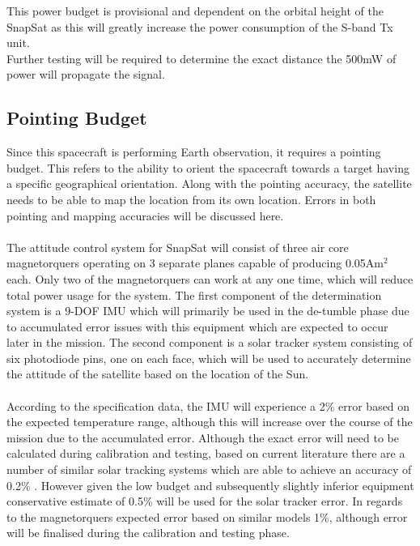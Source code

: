     \noindent
    This power budget is provisional and dependent on the orbital height of the SnapSat as this will greatly increase the power consumption of the S-band Tx unit. \\
    Further testing will be required to determine the exact distance the 500mW of power will propagate the signal.

\subsection{Pointing Budget}

Since this spacecraft is performing Earth observation, it requires a pointing budget. This refers to the ability to orient the spacecraft towards a target having a specific geographical orientation. Along with the pointing accuracy, the satellite needs to be able to map the location from its own location. Errors in both pointing and mapping accuracies will be discussed here. \\
\\\noindent
The attitude control system for SnapSat will consist of three air core magnetorquers operating on 3 separate planes capable of producing 0.05Am$^2$ each.  Only two of the magnetorquers can work at any one time, which will reduce total power usage for the system.  The first component of the determination system is a 9-DOF IMU which will primarily be used in the de-tumble phase due to accumulated error issues with this equipment which are expected to occur later in the mission.  The second component is a solar tracker system consisting of six photodiode pins, one on each face, which will be used to accurately determine the attitude of the satellite based on the location of the Sun. \\
\\\noindent
According to the specification data, the IMU will experience a 2\% error based on the expected temperature range, although this will increase over the course of the mission due to the accumulated error.  Although the exact error will need to be calculated during calibration and testing, based on current literature there are a number of similar solar tracking systems which are able to achieve an accuracy of 0.2\% \cite{beaudette}.  However given the low budget and subsequently slightly inferior equipment conservative estimate of 0.5\% will be used for the solar tracker error.  In regards to the magnetorquers expected error based on similar models 1\%, although error will be finalised during the calibration and testing phase.
